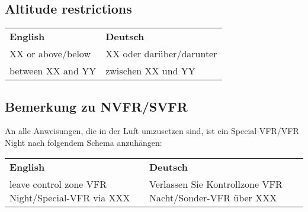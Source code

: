 \subsection{Altitude restrictions}
\begin{table}[H]
	\begin{tabularx}{\textwidth}{XX}
		\textbf{English} & \textbf{Deutsch} \\
		XX or above/below & XX oder darüber/darunter \\
		between XX and YY & zwischen XX und YY      
	\end{tabularx}%
\end{table}

\subsection{Bemerkung zu NVFR/SVFR}
An alle Anweisungen, die in der Luft umzusetzen sind, ist ein Special-VFR/VFR Night nach folgendem Schema anzuhängen:
\begin{table}[H]
	\begin{tabularx}{\textwidth}{XX}
		\textbf{English} & \textbf{Deutsch} \\
		leave control zone VFR Night/Special-VFR via XXX&Verlassen Sie Kontrollzone VFR Nacht/Sonder-VFR über XXX
	\end{tabularx}%
\end{table}


